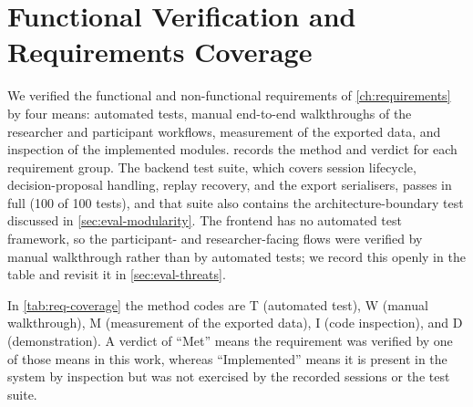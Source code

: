 \section{Functional Verification and Requirements Coverage}
\label{sec:eval-functional}

We verified the functional and non-functional requirements of \cref{ch:requirements} by four means: automated tests, manual end-to-end walkthroughs of the researcher and participant workflows, measurement of the exported data, and inspection of the implemented modules.
 records the method and verdict for each requirement group.
The backend test suite, which covers session lifecycle, decision-proposal handling, replay recovery, and the export serialisers, passes in full (100 of 100 tests), and that suite also contains the architecture-boundary test discussed in \cref{sec:eval-modularity}.
The frontend has no automated test framework, so the participant- and researcher-facing flows were verified by manual walkthrough rather than by automated tests; we record this openly in the table and revisit it in \cref{sec:eval-threats}.

In \cref{tab:req-coverage} the method codes are T (automated test), W (manual walkthrough), M (measurement of the exported data), I (code inspection), and D (demonstration).
A verdict of ``Met'' means the requirement was verified by one of those means in this work, whereas ``Implemented'' means it is present in the system by inspection but was not exercised by the recorded sessions or the test suite.


